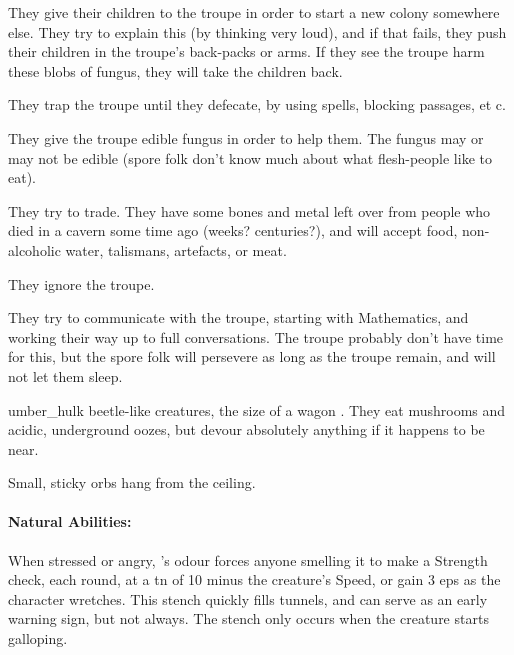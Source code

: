 \begin{multicols}{2}

\begin{dlist}
  \item
  They give their children to the troupe in order to start a new colony somewhere else.
  They try to explain this (by thinking very loud), and if that fails, they push their children in the troupe's back-packs or arms.
  If they see the troupe harm these blobs of fungus, they will take the children back.
  \item
  They trap the troupe until they defecate, by using spells, blocking passages, et c.
  \item
  They give the troupe edible fungus in order to help them.
  The fungus may or may not be edible (spore folk don't know much about what flesh-people like to eat).
  \item
  They try to trade.
  They have some bones and metal left over from people who died in a cavern some time ago (weeks? centuries?), and will accept food, non-alcoholic water, \glspl{talisman}, \glspl{artefact}, or meat.
  \item
  They ignore the troupe.
  \item
  They try to communicate with the troupe, starting with Mathematics, and working their way up to full conversations.
  The troupe probably don't have time for this, but the spore folk will persevere as long as the troupe remain, and will not let them sleep.
\end{dlist}

\sporeFolk

\sporeFolk

\sporeFolk

  {umber_hulk}%
  {beetle-like creatures, the size of a wagon}%
.
They eat mushrooms and acidic, underground oozes, but devour absolutely anything if it happens to be near.

\begin{boxtext}
  Small, sticky orbs hang from the ceiling.
\end{boxtext}

\paragraph{Natural Abilities:} When stressed or angry, 's odour forces anyone smelling it to make a Strength check, each round, at a \gls{tn} of 10 minus the creature's Speed, or gain 3 \glspl{ep} as the character wretches.
This stench quickly fills tunnels, and can serve as an early warning sign, but not always.
The stench only occurs when the creature starts galloping.


\end{multicols}
